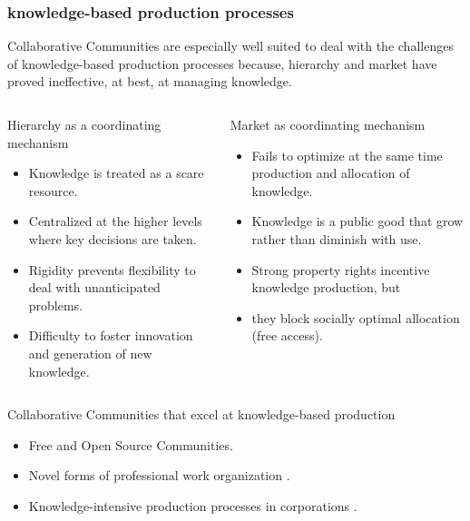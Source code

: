 \documentclass[ignorenonframetext,red,8pt,notes=show]{beamer}
\begin{document}
\begin{frame}
\frametitle{knowledge-based production processes}
Collaborative Communities are especially well suited to deal with the challenges of knowledge-based production processes because, hierarchy and market have proved ineffective, at best, at managing knowledge.  

\begin{columns}[c]

\begin{column}{0.5\textwidth}
\begin{block}{Hierarchy as a coordinating mechanism}
\begin{itemize}
\item Knowledge is treated as a scare resource.
\item Centralized at the higher levels where key decisions are taken.
\item Rigidity prevents flexibility to deal with unanticipated problems.
\item Difficulty to foster innovation and generation of new knowledge.
\end{itemize}
\end{block}
\end{column}

\begin{column}{0.5\textwidth}
\begin{block}{Market as coordinating mechanism}
\begin{itemize}
\item Fails to optimize at the same time production and allocation of knowledge.
\item Knowledge is a public good that grow rather than diminish with use.
\item Strong property rights incentive knowledge production, but
\item they block socially optimal allocation (free access).
\end{itemize}
\end{block}
\end{column}

\end{columns}

\begin{block}{Collaborative Communities that excel at knowledge-based production}
\begin{itemize}
\item Free and Open Source Communities.
\item Novel forms of professional work organization \citep*{adler:2008}.
\item Knowledge-intensive production processes in corporations \citep{adler:2006}.
\end{itemize}
\end{block}

\end{frame}
\end{document}
